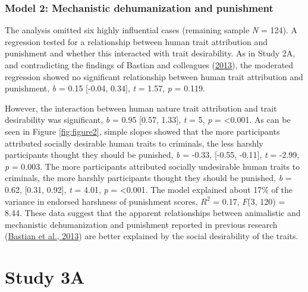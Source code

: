 \documentclass[
]{article}
\begin{document}
\hypertarget{model-2-mechanistic-dehumanization-and-punishment-3}{%
\subsubsection{Model 2: Mechanistic dehumanization and punishment}\label{model-2-mechanistic-dehumanization-and-punishment-3}}

The analysis omitted six highly influential cases (remaining sample \emph{N} = 124). A regression tested for a relationship between human trait attribution and punishment and whether this interacted with trait desirability. As in Study 2A, and contradicting the findings of Bastian and colleagues (\protect\hyperlink{ref-Bastian2013}{2013}), the moderated regression showed no significant relationship between human trait attribution and punishment, \emph{b} = 0.15 {[}-0.04, 0.34{]}, \emph{t} = 1.57, \emph{p} = 0.119.

However, the interaction between human nature trait attribution and trait desirability was significant, \emph{b} = 0.95 {[}0.57, 1.33{]}, \emph{t} = 5, \emph{p} = \textless0.001. As can be seen in Figure \ref{fig:figure2}, simple slopes showed that the more participants attributed socially desirable human traits to criminals, the less harshly participants thought they should be punished, \emph{b} = -0.33, {[}-0.55, -0.11{]}, \emph{t} = -2.99, \emph{p} = 0.003. The more participants attributed socially undesirable human traits to criminals, the more harshly participants thought they should be punished, \emph{b} = 0.62, {[}0.31, 0.92{]}, \emph{t} = 4.01, \emph{p} = \textless0.001. The model explained about 17\% of the variance in endorsed harshness of punishment scores, \(R^2\) = 0.17, \(F\)(3, 120) = 8.44. These data suggest that the apparent relationships between animalistic and mechanistic dehumanization and punishment reported in previous research (\protect\hyperlink{ref-Bastian2013}{Bastian et al., 2013}) are better explained by the social desirability of the traits.

\hypertarget{study-3a}{%
\section{Study 3A}\label{study-3a}}
\end{document}
